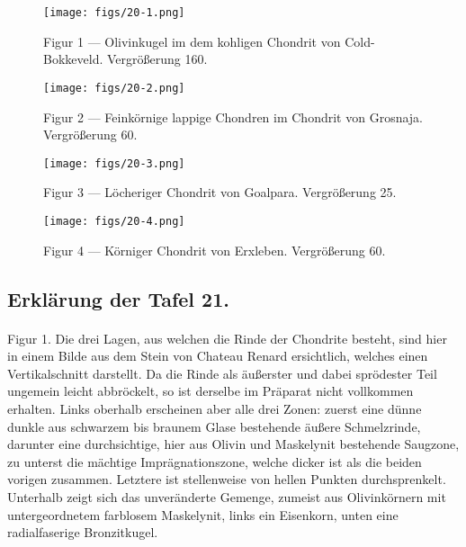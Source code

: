 \documentclass[a4paper, 12pt, oneside]{article}
\begin{document}
\vspace*{\fill}
\begin{figure}[H]
\centering
\texttt{[image: figs/20-1.png]}
\caption{\small Figur 1 --- Olivinkugel im dem kohligen Chondrit von Cold-Bokkeveld. Vergrößerung 160.}
\end{figure}
\vspace*{\fill}
\clearpage

\vspace*{\fill}
\begin{figure}[H]
\centering
\texttt{[image: figs/20-2.png]}
\caption{\small Figur 2 --- Feinkörnige lappige Chondren im Chondrit von Grosnaja. Vergrößerung 60.}
\end{figure}
\vspace*{\fill}
\clearpage

\vspace*{\fill}
\begin{figure}[H]
\centering
\texttt{[image: figs/20-3.png]}
\caption{\small Figur 3 --- Löcheriger Chondrit von Goalpara. Vergrößerung 25.}
\end{figure}
\vspace*{\fill}
\clearpage

\vspace*{\fill}
\begin{figure}[H]
\centering
\texttt{[image: figs/20-4.png]}
\caption{\small Figur 4 --- Körniger Chondrit von Erxleben. Vergrößerung 60.}
\end{figure}
\vspace*{\fill}
\clearpage

\subsection{Erklärung der Tafel 21.}
\paragraph{}
Figur 1. Die drei Lagen, aus welchen die Rinde der Chondrite besteht, sind hier in einem Bilde aus dem Stein von Chateau Renard ersichtlich, welches einen Vertikalschnitt darstellt. Da die Rinde als äußerster und dabei sprödester Teil ungemein leicht abbröckelt, so ist derselbe im Präparat nicht vollkommen erhalten. Links oberhalb erscheinen aber alle drei Zonen: zuerst eine dünne dunkle aus schwarzem bis braunem Glase bestehende äußere Schmelzrinde, darunter eine durchsichtige, hier aus Olivin und Maskelynit bestehende Saugzone, zu unterst die mächtige Imprägnationszone, welche dicker ist als die beiden vorigen zusammen. Letztere ist stellenweise von hellen Punkten durchsprenkelt. Unterhalb zeigt sich das unveränderte Gemenge, zumeist aus Olivinkörnern mit untergeordnetem farblosem Maskelynit, links ein Eisenkorn, unten eine radialfaserige Bronzitkugel.
\end{document}
